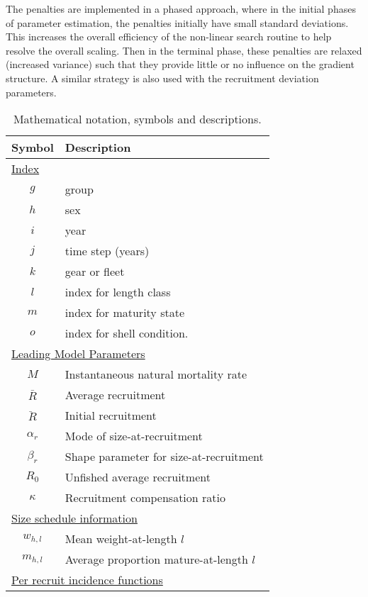 \documentclass[12pt,letterpaper]{article}
\begin{document}
    The penalties are implemented in a phased approach, where in the initial phases of parameter estimation, the penalties initially have small standard deviations. This increases the overall efficiency of the non-linear search routine to help resolve the overall scaling. Then in the terminal phase, these penalties are relaxed (increased variance) such that they provide little or no influence on the gradient structure.  A similar strategy is also used with the recruitment deviation parameters.
\begin{table}
  \centering
  \caption{Mathematical notation, symbols and descriptions.}
  \label{tab:notation}
  \begin{tabular}{cl}
  \hline
  Symbol  & Description \\
  \hline
  \multicolumn{2}{l}{\underline{Index}}\\
      $g$ & group \\
      $h$ & sex \\
      $i$ & year \\
      $j$ & time step (years) \\
      $k$ & gear or fleet \\
      $l$ & index for length class \\
      $m$ & index for maturity state \\
      $o$ & index for shell condition. \\
  \multicolumn{2}{l}{\underline{Leading Model Parameters}}\\
      $M$         & Instantaneous natural mortality rate\\
      $\bar{R}$   & Average recruitment\\
      $\ddot{R}$  & Initial recruitment\\
      $\alpha_r$  & Mode of size-at-recruitment\\
      $\beta_r $  & Shape parameter for size-at-recruitment\\
      $R_0$       & Unfished average recruitment\\
      $\kappa$    & Recruitment compensation ratio\\
  \multicolumn{2}{l}{\underline{Size schedule information}}\\
      $w_{h,l}$   & Mean weight-at-length $l$ \\
      $m_{h,l}$   & Average proportion mature-at-length $l$ \\
  \multicolumn{2}{l}{\underline{Per recruit incidence functions}} \\

\end{tabular}
\end{table}
\end{document}
